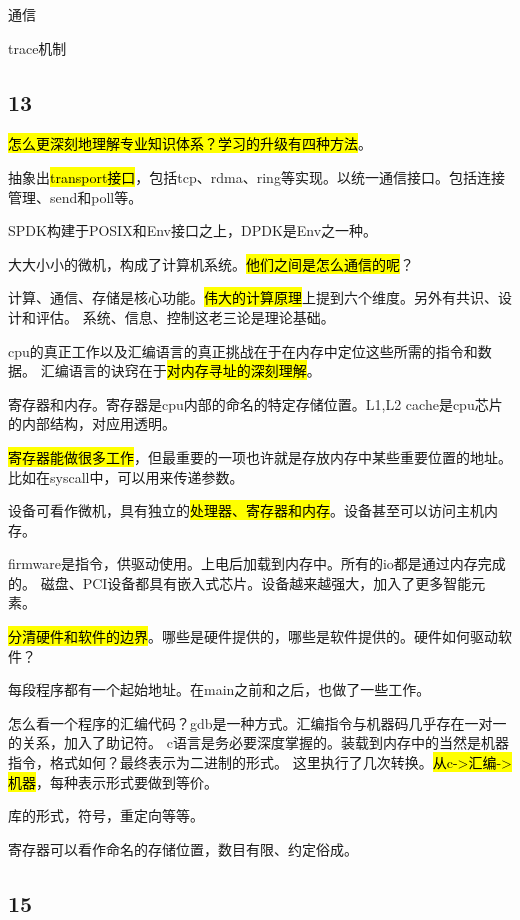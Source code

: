 
通信

trace机制

\subsection{13}

\hl{怎么更深刻地理解专业知识体系？学习的升级有四种方法}。

抽象出\hl{transport接口}，包括tcp、rdma、ring等实现。以统一通信接口。包括连接管理、send和poll等。

SPDK构建于POSIX和Env接口之上，DPDK是Env之一种。

\hrulefill

大大小小的微机，构成了计算机系统。\hl{他们之间是怎么通信的呢}？

计算、通信、存储是核心功能。\hl{伟大的计算原理}上提到六个维度。另外有共识、设计和评估。
系统、信息、控制这老三论是理论基础。

cpu的真正工作以及汇编语言的真正挑战在于在内存中定位这些所需的指令和数据。
汇编语言的诀窍在于\hl{对内存寻址的深刻理解}。

寄存器和内存。寄存器是cpu内部的命名的特定存储位置。L1,L2 cache是cpu芯片的内部结构，对应用透明。

\hl{寄存器能做很多工作}，但最重要的一项也许就是存放内存中某些重要位置的地址。
比如在syscall中，可以用来传递参数。

设备可看作微机，具有独立的\hl{处理器、寄存器和内存}。设备甚至可以访问主机内存。

firmware是指令，供驱动使用。上电后加载到内存中。所有的io都是通过内存完成的。
磁盘、PCI设备都具有嵌入式芯片。设备越来越强大，加入了更多智能元素。

\hl{分清硬件和软件的边界}。哪些是硬件提供的，哪些是软件提供的。硬件如何驱动软件？

每段程序都有一个起始地址。在main之前和之后，也做了一些工作。

怎么看一个程序的汇编代码？gdb是一种方式。汇编指令与机器码几乎存在一对一的关系，加入了助记符。
c语言是务必要深度掌握的。装载到内存中的当然是机器指令，格式如何？最终表示为二进制的形式。
这里执行了几次转换。\hl{从c->汇编->机器}，每种表示形式要做到等价。

库的形式，符号，重定向等等。

寄存器可以看作命名的存储位置，数目有限、约定俗成。

\subsection{15}

